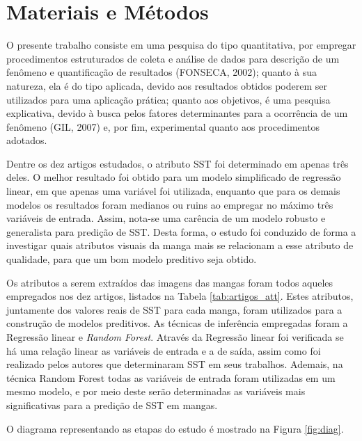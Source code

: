 \chapter{Materiais e Métodos} \label{ch:MM} %

O presente trabalho consiste em uma pesquisa do tipo quantitativa, por empregar procedimentos estruturados de coleta e análise de dados para descrição de um fenômeno e quantificação de resultados (FONSECA, 2002); quanto à sua natureza, ela é do tipo aplicada, devido aos resultados obtidos poderem ser utilizados para uma aplicação prática; quanto aos objetivos, é uma pesquisa explicativa, devido à busca pelos fatores determinantes para a ocorrência de um fenômeno (GIL, 2007) e, por fim, experimental quanto aos procedimentos adotados. 

Dentre os dez artigos estudados, o atributo SST foi determinado em apenas três deles. O melhor resultado foi obtido para um modelo simplificado de regressão linear, em que apenas uma variável foi utilizada, enquanto que para os demais modelos os resultados foram medianos ou ruins ao empregar no máximo três variáveis de entrada. Assim, nota-se uma carência de um modelo robusto e generalista para predição de SST. Desta forma, o estudo foi conduzido de forma a investigar quais atributos visuais da manga mais se relacionam a esse atributo de qualidade, para que um bom modelo preditivo seja obtido.

Os atributos a serem extraídos das imagens das mangas foram todos aqueles empregados nos dez artigos, listados na Tabela \ref{tab:artigos_att}. Estes atributos, juntamente dos valores reais de SST para cada manga, foram utilizados para a construção de modelos preditivos. As técnicas de inferência empregadas foram a Regressão linear e \textit{Random Forest}. Através da Regressão linear foi verificada se há uma relação linear as variáveis de entrada e a de saída, assim como foi realizado pelos autores que determinaram SST em seus trabalhos. Ademais, na técnica Random Forest todas as variáveis de entrada foram utilizadas em um mesmo modelo, e por meio deste serão determinadas as variáveis mais significativas para a predição de SST em mangas. 

O diagrama representando as etapas do estudo é mostrado na Figura \ref{fig:diag}.

